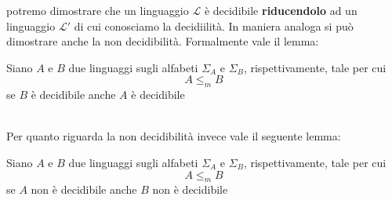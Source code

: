 potremo dimostrare che un linguaggio $\mathcal{L}$ è decidibile \textbf{riducendolo} ad un linguaggio $\mathcal{L}'$ di cui conosciamo la decidiilità. In maniera analoga si può dimostrare anche la non decidibilità. Formalmente vale il lemma:\smallskip\\
\colorbox{SALZO}{\parbox{\dimexpr\linewidth-2\fboxsep}{\begin{lemma}\label{lem}
   Siano $A$ e $B$ due linguaggi sugli alfabeti $\Sigma_A$ e $\Sigma_B$, rispettivamente, tale per cui 
   \[A \le_m B\]
   se $B$ è decidibile anche $A$ è decidibile 
\end{lemma}}}\smallskip\\
Per quanto riguarda la non decidibilità invece vale il seguente lemma:\smallskip\\
\colorbox{SALZO}{\parbox{\dimexpr\linewidth-2\fboxsep}{\begin{lemma}
   Siano $A$ e $B$ due linguaggi sugli alfabeti $\Sigma_A$ e $\Sigma_B$, rispettivamente, tale per cui 
   \[A \le_m B\]
   se $A$ non è decidibile anche $B$ non è decidibile 
\end{lemma}}}\smallskip\\


